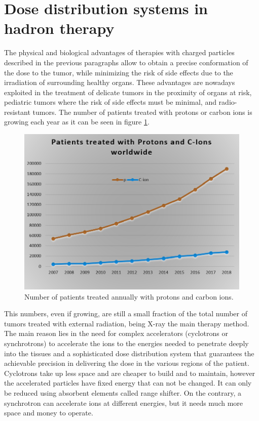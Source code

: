 \section{Dose distribution systems in hadron therapy}
The physical and biological advantages of therapies with charged particles described in the previous paragraphs allow to obtain a precise conformation of the dose to the tumor, while minimizing the risk of side effects due to the irradiation of surrounding healthy organs.
These advantages are nowadays exploited in the treatment of delicate tumors in the proximity of organs at risk, pediatric tumors where the risk of side effects must be minimal, and radio-resistant tumors.
The number of patients treated with protons or carbon ions is growing each year as it can be seen in figure \ref{fig:patientstreated}.
\begin{figure}[H]
	\centering
	\includegraphics[width=0.7\linewidth]{IMG/ch1/PatientsTreated2}
	\caption{Number of patients treated annually with protons and carbon ions\cite{world}.}
	\label{fig:patientstreated}
\end{figure}
\noindent This numbers, even if growing, are still a small fraction of the total number of tumors treated with external radiation, being X-ray the main therapy method. 
The main reason lies in the need for complex accelerators (cyclotrons or synchrotrons) to accelerate the ions to
the energies needed to penetrate deeply into the tissues and a sophisticated dose distribution system that guarantees the achievable precision in delivering the dose in the various regions of the patient.
\newline
Cyclotrons take up less space and are cheaper to build and to maintain, however the accelerated particles have fixed energy that can not be changed. It can only be reduced using absorbent elements called range shifter.
On the contrary, a synchrotron can accelerate ions at different energies, but it needs much more space and money to operate.
